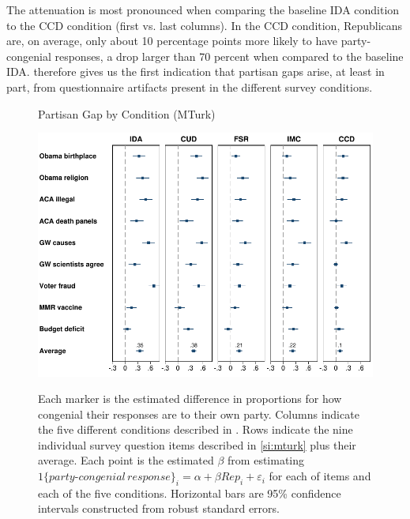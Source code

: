 \documentclass[12pt, letterpaper]{article}
\begin{document}
The attenuation is most pronounced when comparing the baseline IDA condition to the CCD condition (first vs. last columns). In the CCD condition, Republicans are, on average, only about 10 percentage points more likely to have party-congenial responses, a drop larger than 70 percent when compared to the baseline IDA.  therefore gives us the first indication that partisan gaps arise, at least in part, from questionnaire artifacts present in the different survey conditions.


%

\begin{center}
	\begin{figure}[t]
		\centering
		\caption{Partisan Gap by Condition (MTurk)}
		\includegraphics[width=\textwidth]{../figs/partisan-gap-by-item-arm.pdf}
		\label{fig:partisangaps-mturk}
		\caption*{\footnotesize 
			Each marker is the estimated difference in proportions for how congenial their responses are to their own party.
			Columns indicate the five different conditions described in . Rows indicate the nine individual survey question items described in \cref{si:mturk} plus their average.
			Each point is the estimated $\beta$ from estimating $1\{party\text{-}congenial\, response\}_i = \alpha + \beta Rep_i + \varepsilon_i$ for each of items and each of the five conditions.			
			Horizontal bars are 95\% confidence intervals constructed from robust standard errors.
		}
	\end{figure}
\end{center}
\end{document}
